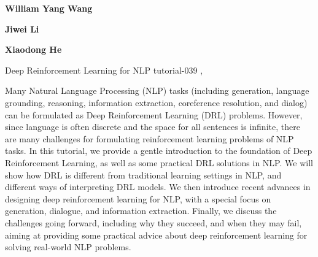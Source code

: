 \begin{bio}
\small
{\bfseries William Yang Wang} 

{\bfseries Jiwei Li}

{\bfseries Xiaodong He}

\end{bio}

\begin{tutorial}{Deep Reinforcement Learning for NLP}
  {tutorial-039}
  {\daydateyear, \tutorialafternoontime}
  {\TutLocG}

Many Natural Language Processing (NLP) tasks (including generation, language grounding, reasoning, information extraction, coreference resolution, and dialog) can be formulated as Deep Reinforcement Learning (DRL) problems. However, since language is often discrete and the space for all sentences is infinite, there are many challenges for formulating reinforcement learning problems of NLP tasks. In this tutorial, we provide a gentle introduction to the foundation of Deep Reinforcement Learning, as well as some practical DRL solutions in NLP. We will show how DRL is different from traditional learning settings in NLP, and different ways of interpreting DRL models. We then introduce recent advances in designing deep reinforcement learning for NLP, with a special focus on generation, dialogue, and information extraction. Finally, we discuss the challenges going forward, including why they succeed, and when they may fail, aiming at providing some practical advice about deep reinforcement learning for solving real-world NLP problems.

\end{tutorial}
